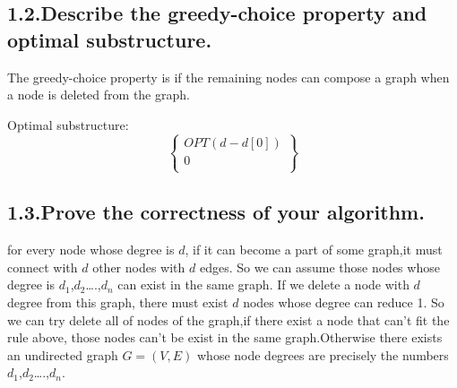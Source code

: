\documentclass[10pt]{article}
\begin{document}
\mdhr{}%

\subsection{1.2.\hspace*{0.5em}Describe the greedy-choice property and optimal substructure.}\label{sec-describe-the-greedy-choice-property-and-optimal-substructure}%

\noindent{}The greedy-choice property is if the remaining nodes can compose a graph when a node is deleted from the graph. %

Optimal substructure:\hspace*{1em}\hspace*{1em}\hspace*{1em}\hspace*{1em}\hspace*{1em}\hspace*{1em}\hspace*{1em}\hspace*{1em}
\[  \begin{Bmatrix}
  OPT(d-d[0])\\
  0\\
  \end{Bmatrix}
\]%

\subsection{1.3.\hspace*{0.5em}Prove the correctness of your algorithm.}\label{sec-prove-the-correctness-of-your-algorithm}%

\noindent{}\hspace*{1em}for every node whose degree is $d$, if it can become a part of some graph,it must connect with $d$ 
other nodes with $d$ edges. So we can assume those nodes whose degree is $d_1$,$d_2$\dots{}.,$d_n$ can 
exist in the same graph. If we delete a node with $d$ degree from this graph, there must exist $d$ nodes 
whose degree can reduce 1. So we can try delete all of nodes of the graph,if there exist a node that 
can't fit the rule above, those nodes can't be exist in the same graph.Otherwise there exists an undirected 
graph $G = (V, E)$ whose node degrees are precisely the numbers  $d_1$,$d_2$\dots{}.,$d_n$. %
\end{document}

